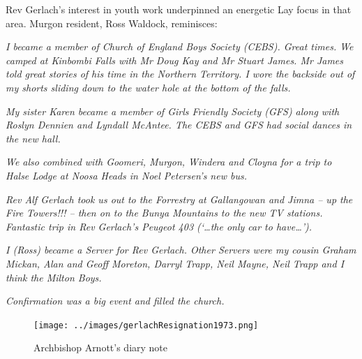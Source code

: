 Rev Gerlach's interest in youth work underpinned an energetic Lay focus in that area. Murgon resident, Ross Waldock, reminisces:



\emph{I became a member of Church of England Boys Society (CEBS). Great times. We camped at Kinbombi Falls with Mr Doug Kay and Mr Stuart James. Mr James told great stories of his time in the Northern Territory. I wore the backside out of my shorts sliding down to the water hole at the bottom of the falls.}



\smallskip


\emph{My sister Karen became a member of Girls Friendly Society (GFS) along with Roslyn Dennien and Lyndall McAntee. The CEBS and GFS had social dances in the new hall.}



\emph{We also combined with Goomeri, Murgon, Windera and Cloyna for a trip to Halse Lodge at Noosa Heads in Noel Petersen's new bus.}



\smallskip


\emph{Rev Alf Gerlach took us out to the Forrestry at Gallangowan and Jimna -- up the Fire Towers!!! -- then on to the Bunya Mountains to the new TV stations. Fantastic trip in Rev Gerlach's Peugeot 403 (`\ldots the only car to have\ldots').}



\smallskip


\emph{I (Ross) became a Server for Rev Gerlach. Other Servers were my cousin Graham Mickan, Alan and Geoff Moreton, Darryl Trapp, Neil Mayne, Neil Trapp and I think the Milton Boys.}



\smallskip


\emph{Confirmation was a big event and filled the church.}



\medskip








\begin{figure}[!htb]
\begin{center}
\texttt{[image: ../images/gerlachResignation1973.png]}
\caption{Archbishop Arnott's diary note}
\end{center}
\end{figure}





